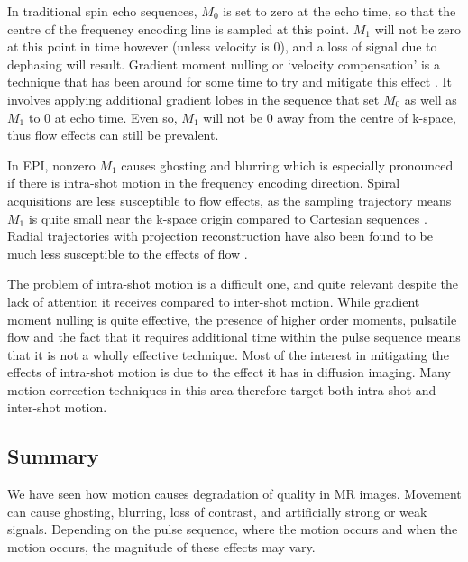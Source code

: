 \documentclass[class=article, crop=false]{standalone}
\begin{document}
\par
In traditional spin echo sequences, $M_0$ is set to zero at the echo time, so that the centre of the frequency encoding line is sampled at this point. $M_1$ will not be zero at this point in time however (unless velocity is 0), and a loss of signal due to dephasing will result. Gradient moment nulling or `velocity compensation' is a technique that has been around for some time to try and mitigate this effect \parencite{Haacke1987}. It involves applying additional gradient lobes in the sequence that set $M_0$ as well as $M_1$ to $0$ at echo time. Even so, $M_1$ will not be $0$ away from the centre of k-space, thus flow effects can still be prevalent.
\par
In EPI, nonzero $M_1$ causes ghosting and blurring which is especially pronounced if there is intra-shot motion in the frequency encoding direction. Spiral acquisitions are less susceptible to flow effects, as the sampling trajectory means $M_1$ is quite small near the k-space origin compared to Cartesian sequences \parencite{Irarrazaval1999,Nishimura}. Radial trajectories with projection reconstruction have also been found to be much less susceptible to the effects of flow \parencite{Nishimura1991}.
\par
The problem of intra-shot motion is a difficult one, and quite relevant despite the lack of attention it receives compared to inter-shot motion. While gradient moment nulling is quite effective, the presence of higher order moments, pulsatile flow and the fact that it requires additional time within the pulse sequence means that it is not a wholly effective technique. Most of the interest in mitigating the effects of intra-shot motion is due to the effect it has in diffusion imaging. Many motion correction techniques in this area therefore target both intra-shot and inter-shot motion.

\subsection{Summary}
We have seen how motion causes degradation of quality in MR images. Movement can cause ghosting, blurring, loss of contrast, and artificially strong or weak signals. Depending on the pulse sequence, where the motion occurs and when the motion occurs, the magnitude of these effects may vary.
\end{document}
